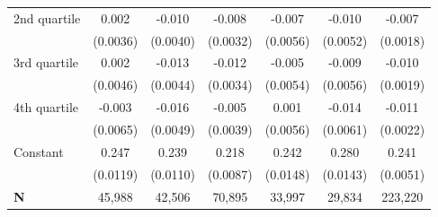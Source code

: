 {\begin{tabular}{l*{6}{c}}
\addlinespace
\hspace*{1em}2nd quartile        &       0.002         &      -0.010\sym{*}  &      -0.008\sym{*}  &      -0.007         &      -0.010         &      -0.007\sym{***}\\
                    &    (0.0036)         &    (0.0040)         &    (0.0032)         &    (0.0056)         &    (0.0052)         &    (0.0018)         \\
\addlinespace
\hspace*{1em}3rd quartile        &       0.002         &      -0.013\sym{**} &      -0.012\sym{***}&      -0.005         &      -0.009         &      -0.010\sym{***}\\
                    &    (0.0046)         &    (0.0044)         &    (0.0034)         &    (0.0054)         &    (0.0056)         &    (0.0019)         \\
\addlinespace
\hspace*{1em}4th quartile        &      -0.003         &      -0.016\sym{***}&      -0.005         &       0.001         &      -0.014\sym{*}  &      -0.011\sym{***}\\
                    &    (0.0065)         &    (0.0049)         &    (0.0039)         &    (0.0056)         &    (0.0061)         &    (0.0022)         \\
\addlinespace
\hspace*{1em}Constant            &       0.247\sym{***}&       0.239\sym{***}&       0.218\sym{***}&       0.242\sym{***}&       0.280\sym{***}&       0.241\sym{***}\\
                    &    (0.0119)         &    (0.0110)         &    (0.0087)         &    (0.0148)         &    (0.0143)         &    (0.0051)         \\
\midrule
\textbf{N}          &      45,988         &      42,506         &      70,895         &      33,997         &      29,834         &     223,220         \\
\bottomrule
\end{tabular}
}
